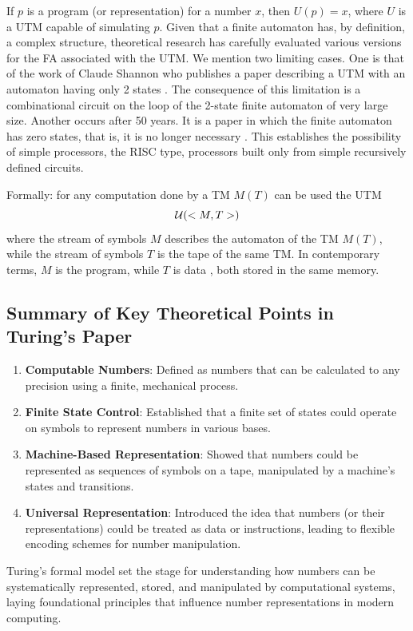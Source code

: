 If \( p \) is a program (or representation) for a number \( x \), then \( U(p) = x \), where \( U \) is a UTM capable of simulating \( p \). Given that a finite automaton has, by definition, a complex structure, theoretical research has carefully evaluated various versions for the FA associated with the UTM. We mention two limiting cases. One is that of the work of Claude Shannon who publishes a paper describing a UTM with an automaton having only 2 states \cite{Shannon56}. The consequence of this limitation is a combinational circuit on the loop of the 2-state finite automaton of very large size. Another occurs after 50 years. It is  a paper in which the finite automaton has zero states, that is, it is no longer necessary \cite{Stefan06Turing}. This establishes the possibility of simple processors, the RISC type, processors built only from simple recursively defined circuits.  

Formally: for any computation done by a TM $M(T)$ can be used the UTM $${\cal U}(<M,T>)$$ where the stream of symbols $M$ describes the automaton of the TM $M(T)$, while the stream of symbols $T$ is the tape of the same TM. In contemporary terms, $M$ is the program, while $T$ is data , both stored in the same memory.

\subsection{Summary of Key Theoretical Points in Turing's Paper}

\begin{enumerate}
    \item \textbf{Computable Numbers}: Defined as numbers that can be calculated to any precision using a finite, mechanical process.
    \item \textbf{Finite State Control}: Established that a finite set of states could operate on symbols to represent numbers in various bases.
    \item \textbf{Machine-Based Representation}: Showed that numbers could be represented as sequences of symbols on a tape, manipulated by a machine’s states and transitions.
    \item \textbf{Universal Representation}: Introduced the idea that numbers (or their representations) could be treated as data or instructions, leading to flexible encoding schemes for number manipulation.
\end{enumerate}

Turing’s formal model set the stage for understanding how numbers can be systematically represented, stored, and manipulated by computational systems, laying foundational principles that influence number representations in modern computing.

